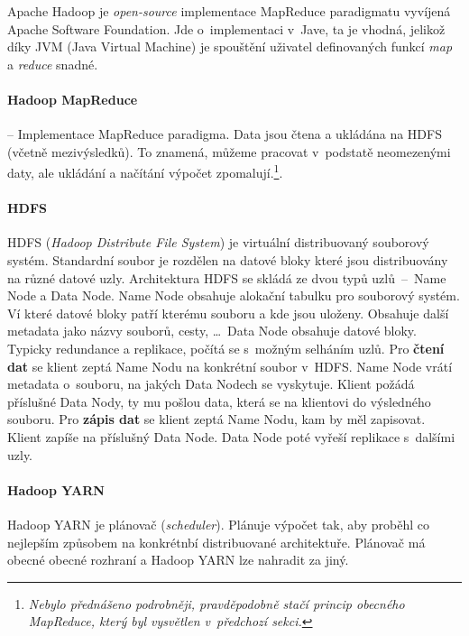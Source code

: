 
Apache Hadoop je \textit{open-source} implementace MapReduce paradigmatu vyvíjená Apache Software Foundation. Jde o~implementaci v~Jave, ta je vhodná, jelikož díky JVM (Java Virtual Machine) je spouštění uživatel definovaných funkcí \textit{map} a \textit{reduce} snadné.

\paragraph*{Hadoop MapReduce} -- Implementace MapReduce paradigma. Data jsou čtena a ukládána na HDFS (včetně mezivýsledků). To znamená, můžeme pracovat v~podstatě neomezenými daty, ale ukládání a načítání výpočet zpomalují.\footnote{\textit{Nebylo přednášeno podrobněji, pravděpodobně stačí princip obecného MapReduce, který byl vysvětlen v~předchozí sekci.}}.

\paragraph*{HDFS} HDFS (\textit{Hadoop Distribute File System}) je virtuální distribuovaný souborový systém. Standardní soubor je rozdělen na datové bloky které jsou distribuovány na různé datové uzly. Architektura HDFS se skládá ze dvou typů uzlů~--~Name Node a Data Node. Name Node obsahuje alokační tabulku pro souborový systém. Ví které datové bloky patří kterému souboru a kde jsou uloženy. Obsahuje další metadata jako názvy souborů, cesty, \dots \, Data Node obsahuje datové bloky. Typicky redundance a replikace, počítá se s~možným selháním uzlů. Pro \textbf{čtení dat} se klient zeptá Name Nodu na konkrétní soubor v~HDFS. Name Node vrátí metadata o~souboru, na jakých Data Nodech se vyskytuje. Klient požádá příslušné Data Nody, ty mu pošlou data, která se na klientovi  do výsledného souboru. Pro \textbf{zápis dat} se klient zeptá Name Nodu, kam by měl zapisovat. Klient zapíše na příslušný Data Node. Data Node poté vyřeší replikace s~dalšími uzly.

\paragraph*{Hadoop YARN} Hadoop YARN je plánovač (\textit{scheduler}). Plánuje výpočet tak, aby proběhl co nejlepším způsobem na konkrétnbí distribuované architektuře. Plánovač má obecné obecné rozhraní a Hadoop YARN lze nahradit za jiný.

